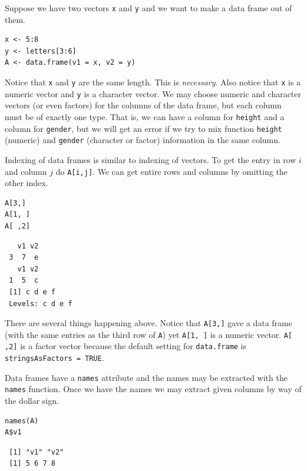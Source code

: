 \documentclass[captions=tableheading]{scrbook}
\begin{document}
\begin{example}
Suppose we have two vectors \texttt{x} and \texttt{y} and we want to make a data frame out of them.


\begin{verbatim}
x <- 5:8
y <- letters[3:6]
A <- data.frame(v1 = x, v2 = y)
\end{verbatim}

\end{example}

Notice that \texttt{x} and \texttt{y} are the same length. This is \emph{necessary}. Also notice that \texttt{x} is a numeric vector and \texttt{y} is a character vector. We may choose numeric and character vectors (or even factors) for the columns of the data frame, but each column must be of exactly one type. That is, we can have a column for \texttt{height} and a column for \texttt{gender}, but we will get an error if we try to mix function \texttt{height} (numeric) and \texttt{gender} (character or factor) information in the same column.

Indexing of data frames is similar to indexing of vectors. To get the entry in row \(i\) and column \(j\) do \texttt{A[i,j]}. We can get entire rows and columns by omitting the other index. 


\begin{verbatim}
A[3,]
A[1, ]
A[ ,2]
\end{verbatim}

\begin{verbatim}
   v1 v2
 3  7  e
   v1 v2
 1  5  c
 [1] c d e f
 Levels: c d e f
\end{verbatim}

There are several things happening above. Notice that \texttt{A[3,]} gave a data frame (with the same entries as the third row of \texttt{A}) yet \texttt{A[1, ]} is a numeric vector. \texttt{A[ ,2]} is a factor vector because the default setting for \texttt{data.frame} is \texttt{stringsAsFactors = TRUE}.

Data frames have a \texttt{names} attribute and the names may be extracted with the \texttt{names} function. Once we have the names we may extract given columns by way of the dollar sign.


\begin{verbatim}
names(A)
A$v1
\end{verbatim}

\begin{verbatim}
 [1] "v1" "v2"
 [1] 5 6 7 8
\end{verbatim}
\end{document}
